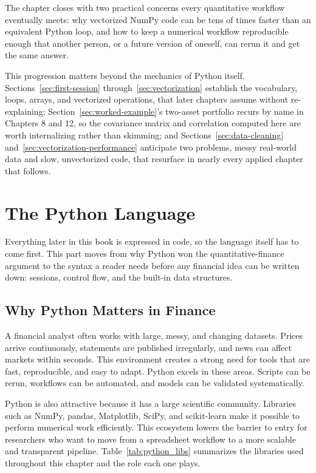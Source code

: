 \documentclass[../ai_in_finance]{subfiles}
\begin{document}
The chapter closes with two practical concerns every quantitative workflow eventually meets: why vectorized NumPy code can be tens of times faster than an equivalent Python loop, and how to keep a numerical workflow reproducible enough that another person, or a future version of oneself, can rerun it and get the same answer.

This progression matters beyond the mechanics of Python itself. Sections~\ref{sec:first-session} through~\ref{sec:vectorization} establish the vocabulary, loops, arrays, and vectorized operations, that later chapters assume without re-explaining; Section~\ref{sec:worked-example}'s two-asset portfolio recurs by name in Chapters 8 and 12, so the covariance matrix and correlation computed here are worth internalizing rather than skimming; and Sections~\ref{sec:data-cleaning} and~\ref{sec:vectorization-performance} anticipate two problems, messy real-world data and slow, unvectorized code, that resurface in nearly every applied chapter that follows.

\section{The Python Language}

Everything later in this book is expressed in code, so the language itself has to come first. This part moves from why Python won the quantitative-finance argument to the syntax a reader needs before any financial idea can be written down: sessions, control flow, and the built-in data structures.

\subsection{Why Python Matters in Finance}

A financial analyst often works with large, messy, and changing datasets. Prices arrive continuously, statements are published irregularly, and news can affect markets within seconds. This environment creates a strong need for tools that are fast, reproducible, and easy to adapt. Python excels in these areas. Scripts can be rerun, workflows can be automated, and models can be validated systematically.

Python is also attractive because it has a large scientific community. Libraries such as NumPy, pandas, Matplotlib, SciPy, and scikit-learn make it possible to perform numerical work efficiently. This ecosystem lowers the barrier to entry for researchers who want to move from a spreadsheet workflow to a more scalable and transparent pipeline. Table~\ref{tab:python_libs} summarizes the libraries used throughout this chapter and the role each one plays.
\end{document}
